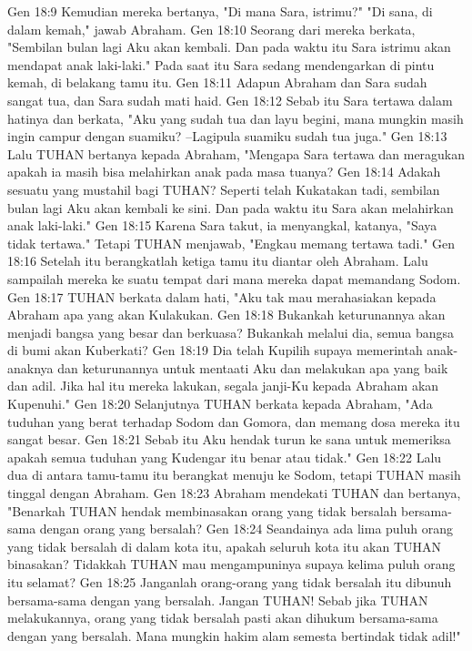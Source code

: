 Gen 18:9  Kemudian mereka bertanya, "Di mana Sara, istrimu?" "Di sana, di dalam kemah," jawab Abraham.
Gen 18:10  Seorang dari mereka berkata, "Sembilan bulan lagi Aku akan kembali. Dan pada waktu itu Sara istrimu akan mendapat anak laki-laki." Pada saat itu Sara sedang mendengarkan di pintu kemah, di belakang tamu itu.
Gen 18:11  Adapun Abraham dan Sara sudah sangat tua, dan Sara sudah mati haid.
Gen 18:12  Sebab itu Sara tertawa dalam hatinya dan berkata, "Aku yang sudah tua dan layu begini, mana mungkin masih ingin campur dengan suamiku? --Lagipula suamiku sudah tua juga."
Gen 18:13  Lalu TUHAN bertanya kepada Abraham, "Mengapa Sara tertawa dan meragukan apakah ia masih bisa melahirkan anak pada masa tuanya?
Gen 18:14  Adakah sesuatu yang mustahil bagi TUHAN? Seperti telah Kukatakan tadi, sembilan bulan lagi Aku akan kembali ke sini. Dan pada waktu itu Sara akan melahirkan anak laki-laki."
Gen 18:15  Karena Sara takut, ia menyangkal, katanya, "Saya tidak tertawa." Tetapi TUHAN menjawab, "Engkau memang tertawa tadi."
Gen 18:16  Setelah itu berangkatlah ketiga tamu itu diantar oleh Abraham. Lalu sampailah mereka ke suatu tempat dari mana mereka dapat memandang Sodom.
Gen 18:17  TUHAN berkata dalam hati, "Aku tak mau merahasiakan kepada Abraham apa yang akan Kulakukan.
Gen 18:18  Bukankah keturunannya akan menjadi bangsa yang besar dan berkuasa? Bukankah melalui dia, semua bangsa di bumi akan Kuberkati?
Gen 18:19  Dia telah Kupilih supaya memerintah anak-anaknya dan keturunannya untuk mentaati Aku dan melakukan apa yang baik dan adil. Jika hal itu mereka lakukan, segala janji-Ku kepada Abraham akan Kupenuhi."
Gen 18:20  Selanjutnya TUHAN berkata kepada Abraham, "Ada tuduhan yang berat terhadap Sodom dan Gomora, dan memang dosa mereka itu sangat besar.
Gen 18:21  Sebab itu Aku hendak turun ke sana untuk memeriksa apakah semua tuduhan yang Kudengar itu benar atau tidak."
Gen 18:22  Lalu dua di antara tamu-tamu itu berangkat menuju ke Sodom, tetapi TUHAN masih tinggal dengan Abraham.
Gen 18:23  Abraham mendekati TUHAN dan bertanya, "Benarkah TUHAN hendak membinasakan orang yang tidak bersalah bersama-sama dengan orang yang bersalah?
Gen 18:24  Seandainya ada lima puluh orang yang tidak bersalah di dalam kota itu, apakah seluruh kota itu akan TUHAN binasakan? Tidakkah TUHAN mau mengampuninya supaya kelima puluh orang itu selamat?
Gen 18:25  Janganlah orang-orang yang tidak bersalah itu dibunuh bersama-sama dengan yang bersalah. Jangan TUHAN! Sebab jika TUHAN melakukannya, orang yang tidak bersalah pasti akan dihukum bersama-sama dengan yang bersalah. Mana mungkin hakim alam semesta bertindak tidak adil!"
